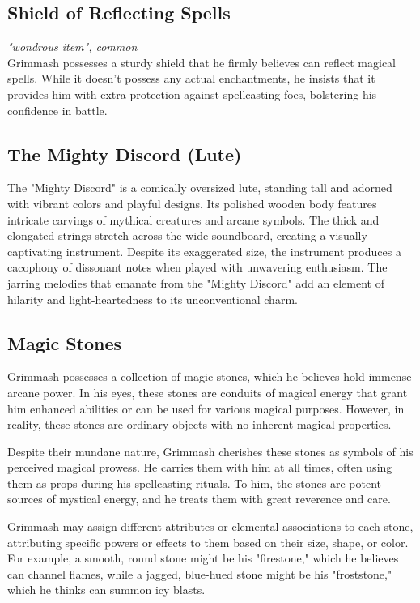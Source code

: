 \documentclass[letterpaper,openany,oneside,twocolumn]{book}
\begin{document}
\subsection*{Shield of Reflecting Spells}
\textit{"wondrous item", common}\\
Grimmash possesses a sturdy shield that he firmly believes can reflect magical spells. While it doesn't possess any actual enchantments, he insists that it provides him with extra protection against spellcasting foes, bolstering his confidence in battle.

\subsection*{The Mighty Discord (Lute)}
The "Mighty Discord" is a comically oversized lute, standing tall and adorned with vibrant colors and playful designs. Its polished wooden body features intricate carvings of mythical creatures and arcane symbols. The thick and elongated strings stretch across the wide soundboard, creating a visually captivating instrument. Despite its exaggerated size, the instrument produces a cacophony of dissonant notes when played with unwavering enthusiasm. The jarring melodies that emanate from the "Mighty Discord" add an element of hilarity and light-heartedness to its unconventional charm.

\subsection*{Magic Stones}
Grimmash possesses a collection of magic stones, which he believes hold immense arcane power. In his eyes, these stones are conduits of magical energy that grant him enhanced abilities or can be used for various magical purposes. However, in reality, these stones are ordinary objects with no inherent magical properties.

Despite their mundane nature, Grimmash cherishes these stones as symbols of his perceived magical prowess. He carries them with him at all times, often using them as props during his spellcasting rituals. To him, the stones are potent sources of mystical energy, and he treats them with great reverence and care.

Grimmash may assign different attributes or elemental associations to each stone, attributing specific powers or effects to them based on their size, shape, or color. For example, a smooth, round stone might be his "firestone," which he believes can channel flames, while a jagged, blue-hued stone might be his "froststone," which he thinks can summon icy blasts.
\end{document}
